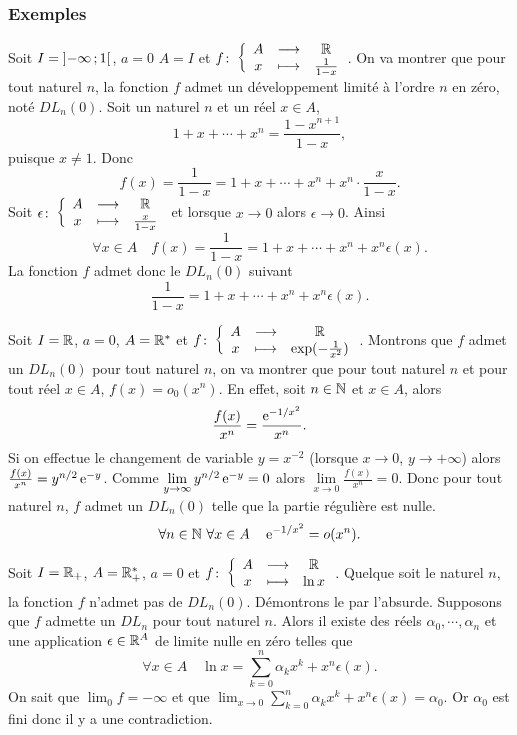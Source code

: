 \subsubsection{Exemples}

Soit \(I=\left] -\infty \, ; {} 1 \right[\), \(a=0\) \(A=I\) et 
\(f\colon\left\{\begin{array}{ccc}A & \longrightarrow &\mathbb{R}\\x & \longmapsto & \frac{1}{1-x}\end{array}\right.\). On va montrer que pour tout naturel 
\(n\), la fonction \(f\) admet un développement limité à l'ordre \(n\) en zéro, 
noté \(DL_n(0)\). Soit un naturel \(n\) et un réel \(x \in A\),
\begin{equation}
  1+x+ \dotsb + x^n = \frac{1-x^{n+1}}{1-x},
\end{equation}
puisque \(x \neq 1\). Donc
\begin{equation}
  f(x) = \frac{1}{1-x}=1+x+ \dotsb + x^n + x^n \cdot \frac{x}{1-x}.
\end{equation}
Soit \(\epsilon\colon\left\{\begin{array}{ccc}A & \longrightarrow &\mathbb{R}\\x & \longmapsto & \frac{x}{1-x}\end{array}\right.\) et lorsque \(x \to 0\) 
alors \(\epsilon \to 0\). Ainsi
\begin{equation}
  \forall x \in A \quad f(x) = \frac{1}{1-x}=1+x+ \dotsb + x^n + x^n 
  \epsilon(x).
\end{equation}
La fonction \(f\) admet donc le \(DL_n(0)\) suivant
\begin{equation}
  \frac{1}{1-x} = 1+x+ \dotsb + x^n + x^n \epsilon(x).
\end{equation}

Soit \(I=\mathbb{R}\), \(a=0\), \(A=\mathbb{R}^*\) et 
\(f\colon\left\{\begin{array}{ccc}A & \longrightarrow &\mathbb{R}\\x & \longmapsto & \exp(-\frac{1}{x^2})\end{array}\right.\). Montrons que \(f\) admet un 
\(DL_n(0)\) pour tout naturel \(n\), on va montrer que pour tout naturel \(n\) 
et pour tout réel \(x \in A\), \(f(x)=o_0(x^n)\). En effet, soit \(n \in \mathbb{N}\) et 
\(x \in A\), alors
\begin{equation}
  \frac{f(x)}{x^n}=\frac{\operatorname{e}^{-1/x^2}}{x^n}.
\end{equation}
Si on effectue le changement de variable \(y=x^{-2}\) (lorsque \(x \to 0\), \(y 
\to + \infty\)) alors \(\frac{f(x)}{x^n}=y^{n/2}\operatorname{e}^{-y}\). Comme 
\(\lim\limits_{y \to \infty} y^{n/2}\operatorname{e}^{-y} =0\) alors \(\lim\limits_{x \to 0} 
\frac{f(x)}{x^n} =0\). Donc pour tout naturel \(n\), \(f\) admet un \(DL_n(0)\) 
telle que la partie régulière est nulle.
\begin{equation}
  \forall n \in \mathbb{N} \ \forall x \in A \quad \operatorname{e}^{-1/x^2}=o(x^n).
\end{equation}

Soit \(I=\mathbb{R}_{+}\), \(A=\mathbb{R}_{+}^{*}\), \(a=0\) et \(f\colon\left\{\begin{array}{ccc}A & \longrightarrow &\mathbb{R}\\x & \longmapsto & \ln 
x\end{array}\right.\). Quelque soit le naturel \(n\), la fonction \(f\) n'admet pas de 
\(DL_n(0)\). Démontrons le par l'absurde. Supposons que \(f\) admette un 
\(DL_n\) pour tout naturel \(n\). Alors il existe des réels \(\alpha_0, \cdots, 
\alpha_n\) et une application \(\epsilon \in \mathbb{R}^A\) de limite nulle en zéro 
telles que
\begin{equation}
  \forall x \in A \quad \ln x =\sum_{k=0}^n \alpha_k x^k + x^n\epsilon(x).
\end{equation}
On sait que \(\lim_0 f = -\infty\) et que \(\lim_{x \to 0} \sum_{k=0}^n \alpha_k 
x^k + x^n\epsilon(x) = \alpha_0\). Or \(\alpha_0\) est fini donc il y a une 
contradiction.


